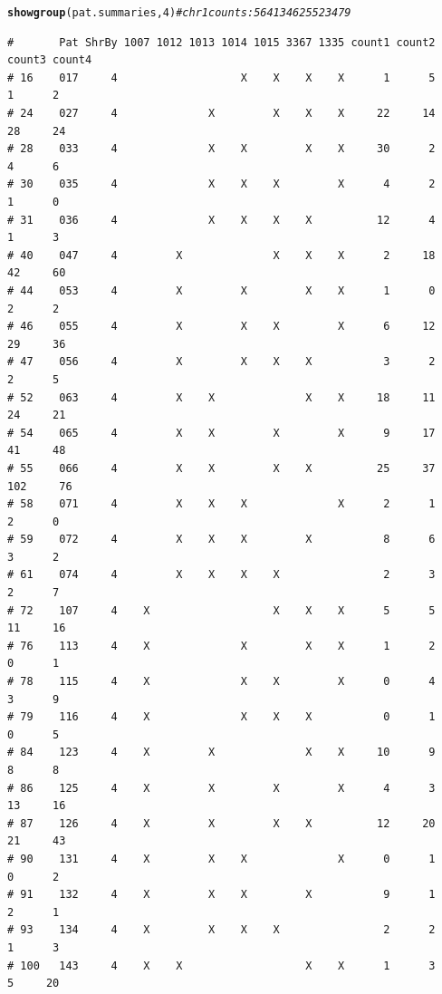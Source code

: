 \documentclass{article}\usepackage[]{graphicx}\usepackage[]{color}
\makeatletter
\newcommand{\hlnum}[1]{\textcolor[rgb]{0.686,0.059,0.569}{#1}}%
\newcommand{\hlcom}[1]{\textcolor[rgb]{0.678,0.584,0.686}{\textit{#1}}}%
\newcommand{\hlstd}[1]{\textcolor[rgb]{0.345,0.345,0.345}{#1}}%
\newcommand{\hlkwd}[1]{\textcolor[rgb]{0.737,0.353,0.396}{\textbf{#1}}}%
\newenvironment{kframe}{%
 \def\at@end@of@kframe{}%
 \ifinner\ifhmode%
  \def\at@end@of@kframe{\end{minipage}}%
  \begin{minipage}{\columnwidth}%
 \fi\fi%
 \def\FrameCommand##1{\hskip\@totalleftmargin \hskip-\fboxsep
 \colorbox{shadecolor}{##1}\hskip-\fboxsep
     \hskip-\linewidth \hskip-\@totalleftmargin \hskip\columnwidth}%
 \MakeFramed {\advance\hsize-\width
   \@totalleftmargin\z@ \linewidth\hsize
   \@setminipage}}%
 {\par\unskip\endMakeFramed%
 \at@end@of@kframe}
\newenvironment{knitrout}{}{} %
\makeatother
\begin{document}
\begin{knitrout}\footnotesize
{}\color{fgcolor}\begin{kframe}
\begin{alltt}
\hlkwd{showgroup}\hlstd{(pat.summaries,}\hlnum{4}\hlstd{)} \hlcom{# chr 1 counts: 564   1346   2552  3479}
\end{alltt}
\begin{verbatim}
#       Pat ShrBy 1007 1012 1013 1014 1015 3367 1335 count1 count2 count3 count4
# 16    017     4                   X    X    X    X      1      5      1      2
# 24    027     4              X         X    X    X     22     14     28     24
# 28    033     4              X    X         X    X     30      2      4      6
# 30    035     4              X    X    X         X      4      2      1      0
# 31    036     4              X    X    X    X          12      4      1      3
# 40    047     4         X              X    X    X      2     18     42     60
# 44    053     4         X         X         X    X      1      0      2      2
# 46    055     4         X         X    X         X      6     12     29     36
# 47    056     4         X         X    X    X           3      2      2      5
# 52    063     4         X    X              X    X     18     11     24     21
# 54    065     4         X    X         X         X      9     17     41     48
# 55    066     4         X    X         X    X          25     37    102     76
# 58    071     4         X    X    X              X      2      1      2      0
# 59    072     4         X    X    X         X           8      6      3      2
# 61    074     4         X    X    X    X                2      3      2      7
# 72    107     4    X                   X    X    X      5      5     11     16
# 76    113     4    X              X         X    X      1      2      0      1
# 78    115     4    X              X    X         X      0      4      3      9
# 79    116     4    X              X    X    X           0      1      0      5
# 84    123     4    X         X              X    X     10      9      8      8
# 86    125     4    X         X         X         X      4      3     13     16
# 87    126     4    X         X         X    X          12     20     21     43
# 90    131     4    X         X    X              X      0      1      0      2
# 91    132     4    X         X    X         X           9      1      2      1
# 93    134     4    X         X    X    X                2      2      1      3
# 100   143     4    X    X                   X    X      1      3      5     20

\end{verbatim}
\end{kframe}
\end{knitrout}
\end{document}
